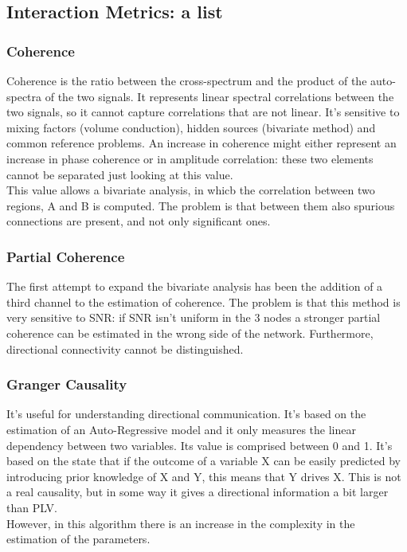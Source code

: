 \subsection{Interaction Metrics: a list}
\subsubsection{Coherence}
Coherence is the ratio between the cross-spectrum and the product of the auto-spectra of the two signals. It represents linear spectral correlations between the two signals, so it cannot capture correlations that are not linear. It's sensitive to mixing factors (volume conduction), hidden sources (bivariate method) and common reference problems. An increase in coherence might either represent an increase in phase coherence or in amplitude correlation: these two elements cannot be separated just looking at this value.\\
This value allows a bivariate analysis, in whicb the correlation between two regions, A and B is computed. The problem is that between them also spurious connections are present, and not only significant ones.
\subsubsection{Partial Coherence}
The first attempt to expand the bivariate analysis has been the addition of a third channel to the estimation of coherence. The problem is that this method is very sensitive to SNR: if SNR isn't uniform in the 3 nodes a stronger partial coherence can be estimated in the wrong side of the network.
Furthermore, directional connectivity cannot be distinguished.
\subsubsection{Granger Causality}
It's useful for understanding directional communication. It's based on the estimation of an Auto-Regressive model and it only measures the linear dependency between two variables. Its value is comprised between 0 and 1.
It's based on the state that if the outcome of a variable X can be easily predicted by introducing prior knowledge of X and Y, this means that Y drives X.
This is not a real causality, but in some way it gives a directional information a bit larger than PLV.\\
However, in this algorithm there is an increase in the complexity in the estimation of the parameters.
